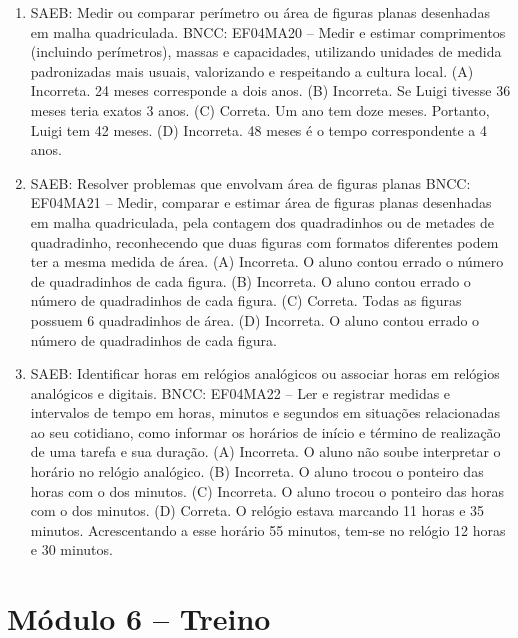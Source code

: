 \begin{enumerate}
\item
SAEB: Medir ou comparar perímetro ou área de figuras planas desenhadas em malha quadriculada.
BNCC: EF04MA20 -- Medir e estimar comprimentos (incluindo perímetros), massas e capacidades, utilizando
unidades de medida padronizadas mais usuais, valorizando e respeitando a cultura local.
(A) Incorreta. 24 meses corresponde a dois anos.
(B) Incorreta. Se Luigi tivesse 36 meses teria exatos 3 anos.
(C) Correta. Um ano tem doze meses. Portanto, Luigi tem 42 meses.
(D) Incorreta. 48 meses é o tempo correspondente a 4 anos.

\item
SAEB: Resolver problemas que envolvam área de figuras planas
BNCC: EF04MA21 -- Medir, comparar e estimar área de figuras planas desenhadas em malha quadriculada,
pela contagem dos quadradinhos ou de metades de quadradinho, reconhecendo que duas figuras
com formatos diferentes podem ter a mesma medida de área.
(A) Incorreta. O aluno contou errado o número de quadradinhos de cada figura.
(B) Incorreta. O aluno contou errado o número de quadradinhos de cada figura.
(C) Correta. Todas as figuras possuem 6 quadradinhos de área.
(D) Incorreta. O aluno contou errado o número de quadradinhos de cada figura.

\item
SAEB: Identificar horas em relógios analógicos ou associar horas em relógios analógicos e digitais.
BNCC: EF04MA22 -- Ler e registrar medidas e intervalos de tempo em horas, minutos e segundos em
situações relacionadas ao seu cotidiano, como informar os horários de início e término de realização
de uma tarefa e sua duração.
(A) Incorreta. O aluno não soube interpretar o horário no relógio analógico.
(B) Incorreta. O aluno trocou o ponteiro das horas com o dos minutos.
(C) Incorreta. O aluno trocou o ponteiro das horas com o dos minutos.
(D) Correta. O relógio estava marcando 11 horas e 35 minutos. Acrescentando a esse horário 55 minutos, tem-se no relógio 12 horas e 30 minutos.
\end{enumerate}

\section*{Módulo 6 – Treino}

